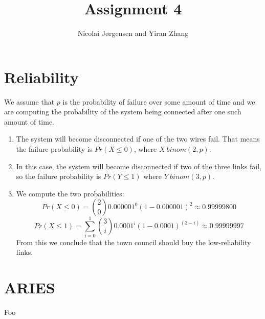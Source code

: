\documentclass[11pt]{article}
\title          {Assignment 4}
\author         {Nicolai Jørgensen and Yiran Zhang}
\begin{document}
\maketitle
\newpage

\section{Reliability}

We assume that $p$ is the probability of failure over some amount of time and we
are computing the probability of the system being connected after one such
amount of time.

\begin{enumerate}
  \item
    The system will become disconnected if one of the two wires fail. That means
    the failure probability is $Pr(X \leq 0)$, where $X ~ binom(2,p)$.
  \item
    In this case, the system will become disconnected if two of the three links
    fail, so the failure probability is $Pr(Y \leq 1)$ where $Y ~ binom(3,p)$.
  \item
    We compute the two probabilities:
    $$ Pr(X \leq 0) = { 2 \choose 0 } 0.000001^0(1-0.000001)^2 \approx 0.99999800 $$
    $$ Pr(X \leq 1) = \sum_{i=0}^1 { 3 \choose i }0.0001^i(1-0.0001)^{(3-i)} \approx 0.99999997 $$
    From this we conclude that the town council should buy the low-reliability links.
\end{enumerate}

\section{ARIES}

Foo
\end{document}

